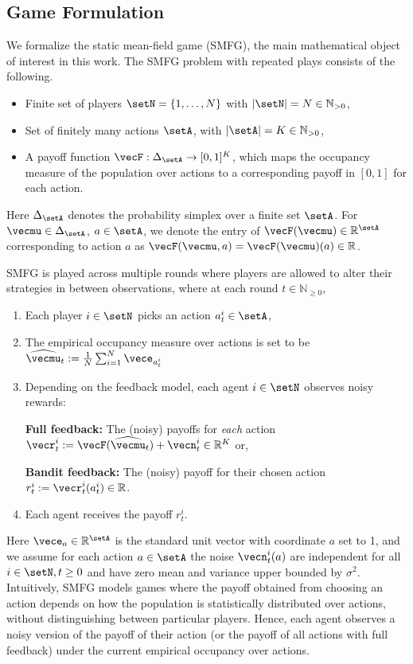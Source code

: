 \subsection{Game Formulation}\label{sec:game_initial_formulation}
We formalize the static mean-field game (SMFG), the main mathematical object of interest in this work.
The SMFG problem with repeated plays consists of the following.
\begin{itemize}
 \setlength\itemsep{0em}
    \item Finite set of players $\setN = \{ 1, \ldots, N\}$ with $|\setN| = N \in \mathbb{N}_{ > 0}$,
    \item Set of finitely many actions $\setA$, with $|\setA| = K \in \mathbb{N}_{ > 0}$, 
    \item A payoff function $\vecF: \Delta_\setA \rightarrow [0,1]^K$, which maps the occupancy measure of the population over actions to a corresponding payoff in $[0,1]$ for each action. 
\end{itemize}
Here $\Delta_\setA$ denotes the probability simplex over a finite set $\setA$. For $\vecmu\in\Delta_\setA$, $a\in\setA$, we denote the entry of $\vecF(\vecmu)\in\mathbb{R}^{\setA}$  corresponding to action $a$ as  $\vecF(\vecmu, a) = \vecF(\vecmu)(a) \in\mathbb{R}$.

SMFG is played across multiple rounds where players are allowed to alter their strategies in between observations, where at each round $t\in \mathbb{N}_{\geq 0}$,
\begin{enumerate} 
 \setlength\itemsep{0em}
    \item Each player $i \in \setN$ picks an action $a_t^i \in \setA$,
    \item The empirical occupancy measure over actions is set to be $\widehat{\vecmu}_t := \frac{1}{N} \sum_{i=1}^N \vece_{a_t^i}$ 
    \item Depending on the feedback model, each agent $i \in \setN$ observes noisy rewards:
    
    \textbf{Full feedback: } The (noisy) payoffs for \emph{each} action $\vecr^i_t := \vecF(\widehat{\vecmu}_t) + \vecn_t^i \in \mathbb{R}^{K}$ or,
    
    \textbf{Bandit feedback: } The (noisy) payoff for their chosen action $r^i_t := \vecr^i_t(a_t^i) \in \mathbb{R}$.
    \item Each agent receives the payoff $r^i_t$.
\end{enumerate}
Here $\vece_a \in \mathbb{R}^\setA$ is the standard unit vector with coordinate $a$ set to 1, and we assume for each action $a\in\setA$ the noise  $\vecn_t^i(a)$ are independent for all $i \in \setN, t \geq 0$ and have zero mean and variance upper bounded by $\sigma^2$.
Intuitively, SMFG models games where the payoff obtained from choosing an action depends on how the population is statistically distributed over actions, without distinguishing between particular players.
Hence, each agent observes a noisy version of the payoff of their action (or the payoff of all actions with full feedback) under the current empirical occupancy over actions.

